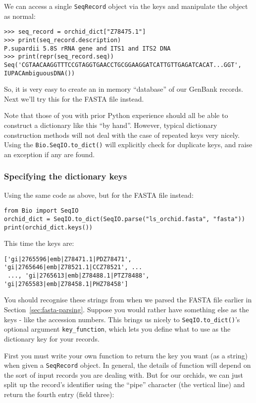 We can access a single \verb|SeqRecord| object via the keys and manipulate the object as normal:

\begin{verbatim}
>>> seq_record = orchid_dict["Z78475.1"]
>>> print(seq_record.description)
P.supardii 5.8S rRNA gene and ITS1 and ITS2 DNA
>>> print(repr(seq_record.seq))
Seq('CGTAACAAGGTTTCCGTAGGTGAACCTGCGGAAGGATCATTGTTGAGATCACAT...GGT', IUPACAmbiguousDNA())
\end{verbatim}

So, it is very easy to create an in memory ``database'' of our GenBank records.  Next we'll try this for the FASTA file instead.

Note that those of you with prior Python experience should all be able to construct a dictionary like this ``by hand''.  However, typical dictionary construction methods will not deal with the case of repeated keys very nicely.  Using the \verb|Bio.SeqIO.to_dict()| will explicitly check for duplicate keys, and raise an exception if any are found.

\subsubsection{Specifying the dictionary keys}
\label{sec:seqio-todict-functionkey}

Using the same code as above, but for the FASTA file instead:

\begin{verbatim}
from Bio import SeqIO
orchid_dict = SeqIO.to_dict(SeqIO.parse("ls_orchid.fasta", "fasta"))
print(orchid_dict.keys())
\end{verbatim}

\noindent This time the keys are:

\begin{verbatim}
['gi|2765596|emb|Z78471.1|PDZ78471', 'gi|2765646|emb|Z78521.1|CCZ78521', ...
 ..., 'gi|2765613|emb|Z78488.1|PTZ78488', 'gi|2765583|emb|Z78458.1|PHZ78458']
\end{verbatim}

You should recognise these strings from when we parsed the FASTA file earlier in Section~\ref{sec:fasta-parsing}.  Suppose you would rather have something else as the keys - like the accession numbers.  This brings us nicely to \verb|SeqIO.to_dict()|'s optional argument \verb|key_function|, which lets you define what to use as the dictionary key for your records.

First you must write your own function to return the key you want (as a string) when given a \verb|SeqRecord| object.  In general, the details of function will depend on the sort of input records you are dealing with.  But for our orchids, we can just split up the record's identifier using the ``pipe'' character (the vertical line) and return the fourth entry (field three):

